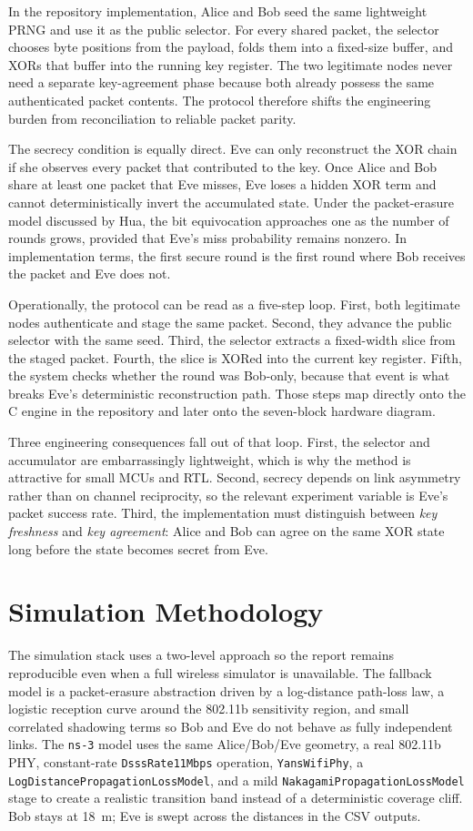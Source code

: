 \documentclass[11pt]{article}
\newcommand{\BobDistanceMeters}{18}
\begin{document}
In the repository implementation, Alice and Bob seed the same lightweight PRNG and use it as the public selector. For every shared packet, the selector chooses byte positions from the payload, folds them into a fixed-size buffer, and XORs that buffer into the running key register. The two legitimate nodes never need a separate key-agreement phase because both already possess the same authenticated packet contents. The protocol therefore shifts the engineering burden from reconciliation to reliable packet parity.

The secrecy condition is equally direct. Eve can only reconstruct the XOR chain if she observes every packet that contributed to the key. Once Alice and Bob share at least one packet that Eve misses, Eve loses a hidden XOR term and cannot deterministically invert the accumulated state. Under the packet-erasure model discussed by Hua, the bit equivocation approaches one as the number of rounds grows, provided that Eve's miss probability remains nonzero. In implementation terms, the first secure round is the first round where Bob receives the packet and Eve does not.

Operationally, the protocol can be read as a five-step loop. First, both legitimate nodes authenticate and stage the same packet. Second, they advance the public selector with the same seed. Third, the selector extracts a fixed-width slice from the staged packet. Fourth, the slice is XORed into the current key register. Fifth, the system checks whether the round was Bob-only, because that event is what breaks Eve's deterministic reconstruction path. Those steps map directly onto the C engine in the repository and later onto the seven-block hardware diagram.

Three engineering consequences fall out of that loop. First, the selector and accumulator are embarrassingly lightweight, which is why the method is attractive for small MCUs and RTL. Second, secrecy depends on link asymmetry rather than on channel reciprocity, so the relevant experiment variable is Eve's packet success rate. Third, the implementation must distinguish between \emph{key freshness} and \emph{key agreement}: Alice and Bob can agree on the same XOR state long before the state becomes secret from Eve.

\section{Simulation Methodology}
The simulation stack uses a two-level approach so the report remains reproducible even when a full wireless simulator is unavailable. The fallback model is a packet-erasure abstraction driven by a log-distance path-loss law, a logistic reception curve around the 802.11b sensitivity region, and small correlated shadowing terms so Bob and Eve do not behave as fully independent links. The \texttt{ns-3} model uses the same Alice/Bob/Eve geometry, a real 802.11b PHY, constant-rate \texttt{DsssRate11Mbps} operation, \texttt{YansWifiPhy}, a \texttt{LogDistancePropagationLossModel}, and a mild \texttt{NakagamiPropagationLossModel} stage to create a realistic transition band instead of a deterministic coverage cliff. Bob stays at \SI{\BobDistanceMeters}{m}; Eve is swept across the distances in the CSV outputs.
\end{document}
